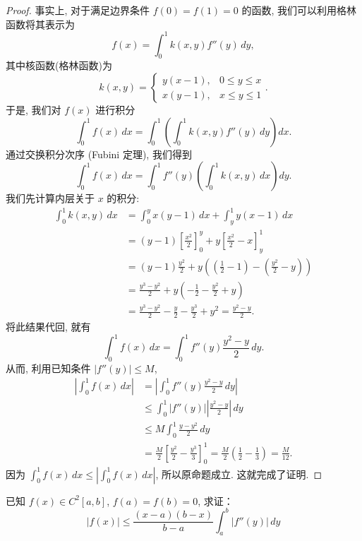 \documentclass[lang=cn,10pt,thmcnt=section]{elegantbook}
\begin{document}
\begin{proof}
    事实上, 对于满足边界条件 $f(0)=f(1)=0$ 的函数, 我们可以利用格林函数将其表示为
    \[
    f(x) = \int_0^1 k(x,y) f''(y) \, dy,
    \]
    其中核函数(格林函数)为
    \[
    k(x,y) = 
    \begin{cases}
        y(x-1), & 0 \le y \le x \\
        x(y-1), & x \le y \le 1
    \end{cases}
    .
    \]
    于是, 我们对 $f(x)$ 进行积分
    \[
    \int_0^1 f(x) \, dx = \int_0^1 \left( \int_0^1 k(x,y) f''(y) \, dy \right) dx.
    \]
    通过交换积分次序 (Fubini 定理), 我们得到
    \[
    \int_0^1 f(x) \, dx = \int_0^1 f''(y) \left( \int_0^1 k(x,y) \, dx \right) dy.
    \]
    我们先计算内层关于 $x$ 的积分:
    \begin{align*}
        \int_0^1 k(x,y) \, dx &= \int_0^y x(y-1) \, dx + \int_y^1 y(x-1) \, dx \\
        &= (y-1) \left[ \frac{x^2}{2} \right]_0^y + y \left[ \frac{x^2}{2} - x \right]_y^1 \\
        &= (y-1)\frac{y^2}{2} + y \left( (\frac{1}{2} - 1) - (\frac{y^2}{2} - y) \right) \\
        &= \frac{y^3-y^2}{2} + y \left( -\frac{1}{2} - \frac{y^2}{2} + y \right) \\
        &= \frac{y^3-y^2}{2} - \frac{y}{2} - \frac{y^3}{2} + y^2 = \frac{y^2-y}{2}.
    \end{align*}
    将此结果代回, 就有
    \[
    \int_0^1 f(x) \, dx = \int_0^1 f''(y) \frac{y^2-y}{2} \, dy.
    \]
    从而, 利用已知条件 $|f''(y)| \le M$,
    \begin{align*}
        \left| \int_0^1 f(x) \, dx \right| &= \left| \int_0^1 f''(y) \frac{y^2-y}{2} \, dy \right| \\
        &\le \int_0^1 |f''(y)| \left| \frac{y^2-y}{2} \right| \, dy \\
        &\le M \int_0^1 \frac{y-y^2}{2} \, dy \\
        &= \frac{M}{2} \left[ \frac{y^2}{2} - \frac{y^3}{3} \right]_0^1 = \frac{M}{2} \left( \frac{1}{2} - \frac{1}{3} \right) = \frac{M}{12}.
    \end{align*}
    因为 $\int_0^1 f(x) \, dx \le \left|\int_0^1 f(x) \, dx\right|$, 所以原命题成立. 这就完成了证明.
\end{proof}
\begin{example}
	已知 \( f(x) \in C^2[a, b] \), \( f(a) = f(b) = 0 \), 求证：
    \[ |f(x)| \leq \frac{(x - a)(b - x)}{b - a} \int_{a}^{b} |f''(y)| \, dy \]
\end{example}
\end{document}
